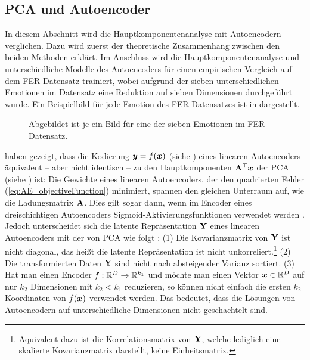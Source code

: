 \subsection{PCA und Autoencoder}
\label{ch:Vergleich:sec:Resultate:PCA_AE}

In diesem Abschnitt wird die Hauptkomponentenanalyse mit Autoencodern verglichen. Dazu wird zuerst
der theoretische Zusammenhang zwischen den beiden Methoden erklärt. Im Anschluss wird die
Hauptkomponentenanalyse und unterschiedliche Modelle des Autoencoders für einen empirischen
Vergleich auf dem FER-Datensatz trainiert, wobei aufgrund der sieben unterschiedlichen Emotionen im
Datensatz eine Reduktion auf sieben Dimensionen durchgeführt wurde. Ein Beispielbild für jede
Emotion des FER-Datensatzes ist in  dargestellt.

\begin{figure}[ht]
	\centering
	
	\caption[Beispielbilder des FER-Datensatzes]{Abgebildet ist je ein Bild für eine der sieben Emotionen im FER-Datensatz.}
	\label{fig:FER-Datensatz-Beispiele}
\end{figure}

\textcites{Baldi.1989}{Bourlard.1988} haben gezeigt, dass die Kodierung $\bm{y} = f(\bm{x})$ (siehe ) eines linearen Autoencoders äquivalent -- aber nicht identisch -- zu den Hauptkomponenten $\mathbf{A}^\top\bm{x}$ der PCA (siehe ) ist: Die Gewichte eines linearen Autoencoders, der den quadrierten Fehler (\eqref{eq:AE_objectiveFunction}) minimiert, spannen den gleichen Unterraum auf, wie die Ladungsmatrix $\mathbf{A}$. Dies gilt sogar dann, wenn im Encoder eines dreischichtigen Autoencoders Sigmoid-Aktivierungsfunktionen verwendet werden \parencite[291, 293]{Bourlard.1988}. Jedoch unterscheidet sich die latente Repräsentation $\mathbf{Y}$
eines linearen Autoencoders mit der von PCA wie folgt \parencite[3]{Plaut.2018}: (1) Die Kovarianzmatrix von $\mathbf{Y}$ ist nicht diagonal, das heißt die
latente Repräsentation ist nicht unkorreliert.\footnote{Äquivalent dazu ist die Korrelationsmatrix
	von $\mathbf{Y}$, welche lediglich eine skalierte Kovarianzmatrix darstellt, keine Einheitsmatrix.}
(2) Die transformierten Daten $\mathbf{Y}$ sind nicht nach absteigender Varianz sortiert. (3) Hat man
einen Encoder $f: \mathbb{R}^D \rightarrow \mathbb{R}^{k_1}$ und möchte man einen Vektor $\bm{x} \in
	\mathbb{R}^D$ auf nur $k_2$ Dimensionen mit $k_2 < k_1$ reduzieren, so können nicht einfach die ersten
$k_2$ Koordinaten von $f(\bm{x})$ verwendet werden. Das bedeutet, dass die Lösungen von
Autoencodern auf unterschiedliche Dimensionen nicht geschachtelt sind.

